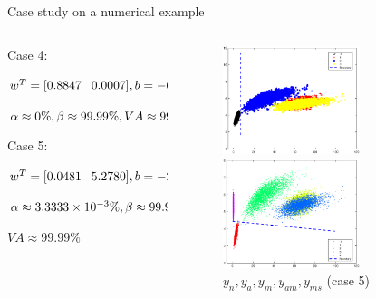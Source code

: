 \documentclass[10pt]{beamer}
\begin{document}
\begin{frame}{Case study on a numerical example}
     \begin{columns}
             \begin{column}{0.5\textwidth}
       Case 4: \par
     $\scriptsize{w^T = [ 0.8847 \quad 0.0007]
 , b =-6.3180 } $\par $\scriptsize{\alpha  \approx 0\%,\beta  \approx 99.99 \% ,VA \approx 99.99} \% $ \par 
Case 5: \par 
   $\scriptsize{w^T = [0.0481 \quad 5.2780]
 , b = -23.5837} $\par $\scriptsize{\alpha  \approx 3.3333\times 10^{-3} \%,\beta  \approx 99.97\% }$ \par 
$VA \approx 99.99 \% $
           \end{column}
        \begin{column}{0.5\textwidth}  %
    \begin{figure}
        \centering
        \includegraphics[width=4cm]{fig/Cu3.eps}
        \caption{$y_n,y_a,y_m,y_{am}$ (case 4)}
        \includegraphics[width=4cm]{fig/miniVarP.eps}
        \caption{ $y_n,y_a,y_{m},y_{am},y_{ms}$ (case 5)}
        \end{figure}
  
        \end{column}
    \end{columns}
\end{frame}
\end{document}
